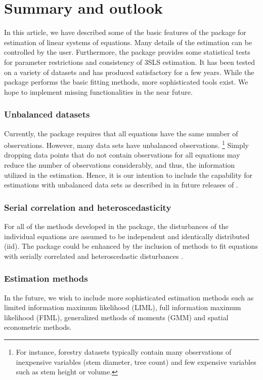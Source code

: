 

\section{Summary and outlook}\label{sec:Summmary}
\nopagebreak
In this article, we have described some of the basic features of the
 package for estimation of linear systems of
equations.
Many details of the estimation can be controlled by the user.
Furthermore, the package provides some statistical tests
for parameter restrictions and consistency of 3SLS estimation.
It has been tested on a variety of datasets and has produced satisfactory
for a few years.
While the  package performs the basic fitting methods,
more sophisticated tools exist.
We hope to implement missing functionalities
in the near future.

\subsubsection*{Unbalanced datasets}
Currently, the  package requires
that all equations have the same number of observations.
However, many data sets have unbalanced observations.%
\footnote{
For instance,
forestry datasets typically contain many observations of inexpensive
variables (stem diameter, tree count) and few expensive variables such
as stem height or volume.
}
Simply dropping data points that do not contain observations for all
equations may reduce the number of observations considerably, and
thus, the information utilized in the estimation.
Hence, it is our intention to include the capability for estimations
with unbalanced data sets as described in \citet{schmidt77} in future
releases of .

\subsubsection*{Serial correlation and heteroscedasticity}
For all of the methods developed in the package, the disturbances of
the individual equations are assumed to be independent and identically
distributed (iid).
The package could be enhanced by the inclusion of methods to fit
equations with serially correlated and heteroscedastic disturbances
\citep{parks67}. 

\subsubsection*{Estimation methods}
In the future, we wish to include more sophisticated estimation
methods such as limited information maximum likelihood (LIML),
full information maximum likelihood (FIML), generalized methods of
moments (GMM) and spatial econometric methods. 

